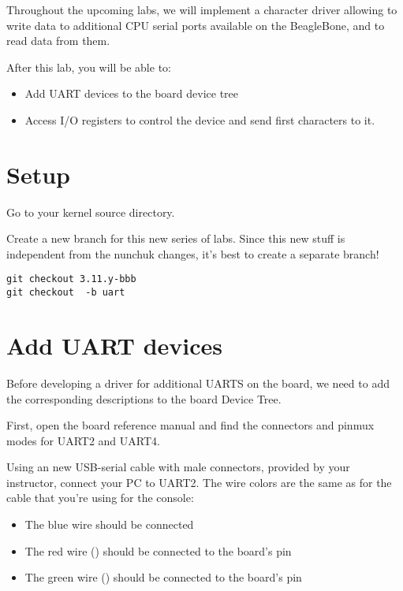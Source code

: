 
Throughout the upcoming labs, we will implement a character driver
allowing to write data to additional CPU serial ports available on 
the BeagleBone, and to read data from them.

After this lab, you will be able to:

\begin{itemize}
\item Add UART devices to the board device tree
\item Access I/O registers to control the device and
      send first characters to it.
\end{itemize}

\section{Setup}

Go to your kernel source directory.

Create a new branch for this new series of labs. Since this new stuff
is independent from the nunchuk changes, it's best to create a separate
branch!

\begin{verbatim}
git checkout 3.11.y-bbb
git checkout  -b uart
\end{verbatim}

\section{Add UART devices}

Before developing a driver for additional UARTS on the board, we
need to add the corresponding descriptions to the board Device Tree.

First, open the board reference manual and find the connectors
and pinmux modes for UART2 and UART4.

Using an new USB-serial cable with male connectors, provided by your
instructor, connect your PC to UART2. The wire colors are the same
as for the cable that you're using for the console:

\begin{itemize}
\item The blue wire should be connected  
\item The red wire () should be connected to the board's  pin
\item The green wire () should be connected to the board's  pin
\end{itemize}

